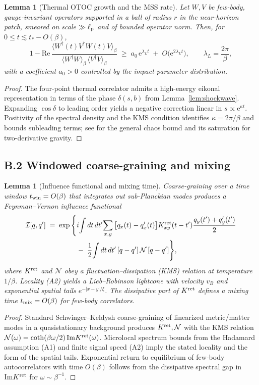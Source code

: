 \documentclass[aps,prd,preprint,onecolumn,superscriptaddress,nofootinbib,longbibliography,floatfix,11pt,showpacs,showkeys]{revtex4-2}
\theoremstyle{plain}
\newtheorem{lemma}[theorem]{Lemma}
\theoremstyle{definition}
\theoremstyle{remark}
\begin{document}
\begin{lemma}[Thermal OTOC growth and the MSS rate]
\label{lem:otoc-growth}
Let $W,V$ be few-body, gauge-invariant operators supported in a ball of radius $r$ in the near-horizon patch, smeared on scale $\gg \ell_{\rm p}$ and of bounded operator norm.
Then, for $0\le t \lesssim t_\ast-O(\beta)$,
\[
1-\mathrm{Re}\,\frac{\langle W^\dagger(t)V^\dagger W(t)V\rangle_\beta}{\langle W^\dagger W\rangle_\beta\,\langle V^\dagger V\rangle_\beta}
\;\ge\; a_0\,\mathrm{e}^{\lambda_L t}\;+\;O\!\big(\mathrm{e}^{2\lambda_L t}\big),
\qquad \lambda_L=\frac{2\pi}{\beta},
\]
with a coefficient $a_0>0$ controlled by the impact-parameter distribution.
\end{lemma}
\begin{proof}
The four-point thermal correlator admits a high-energy eikonal representation in terms of the phase $\delta(s,b)$ from Lemma~\ref{lem:shockwave}.
Expanding $\cos\delta$ to leading order yields a negative correction linear in $s\propto \mathrm{e}^{\kappa t}$.
Positivity of the spectral density and the KMS condition identifies $\kappa=2\pi/\beta$ and bounds subleading terms; see \cite{Maldacena:2016} for the general chaos bound and its saturation for two-derivative gravity.
\end{proof}

\subsection*{B.2 Windowed coarse-graining and mixing}
\begin{lemma}[Influence functional and mixing time]
\label{lem:IF}
Coarse-graining over a time window $t_{\rm win}=O(\beta)$ that integrates out sub-Planckian modes produces a Feynman--Vernon influence functional
\begin{align*}
\mathcal{I}[q,q'] \;=\; \exp\Bigg\{& i\!\int dt\,dt'\!\sum_{x,y}\big[q_x(t)-q'_x(t)\big]K^{\rm ret}_{xy}(t-t')\frac{q_y(t')+q'_y(t')}{2} \\
&-\;\frac{1}{2}\!\int dt\,dt'\,[q-q']\,\mathcal{N}\,[q-q']\Bigg\},
\end{align*}
where $K^{\rm ret}$ and $\mathcal{N}$ obey a fluctuation--dissipation (KMS) relation at temperature $1/\beta$.
Locality (A2) yields a Lieb--Robinson lightcone with velocity $v_B$ and exponential spatial tails $e^{-|x-y|/\xi}$.
The dissipative part of $K^{\rm ret}$ defines a mixing time $t_{\rm mix}=O(\beta)$ for few-body correlators.
\end{lemma}
\begin{proof}
Standard Schwinger--Keldysh coarse-graining of linearized metric/matter modes in a quasistationary background produces $K^{\rm ret},\mathcal{N}$ with the KMS relation $\mathcal{N}(\omega)=\coth(\beta\omega/2)\,\mathrm{Im}K^{\rm ret}(\omega)$.
Microlocal spectrum bounds from the Hadamard assumption (A1) and finite signal speed (A2) imply the stated locality and the form of the spatial tails.
Exponential return to equilibrium of few-body autocorrelators with time $O(\beta)$ follows from the dissipative spectral gap in $\mathrm{Im}K^{\rm ret}$ for $\omega\sim \beta^{-1}$.
\end{proof}
\end{document}

